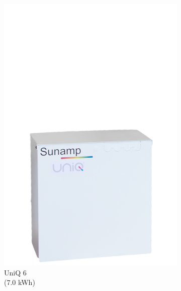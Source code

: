 \begin{figure}[htbp]
\begin{subfigure}{.24\textwidth}
		\includegraphics[width=\textwidth]{figures/sunamp-uniq-6.png}
		\caption{UniQ 6\\
			(7.0 kWh)}
		\label{fig:uniq6}
	\end{subfigure}
	\begin{subfigure}{.24\textwidth}
		\centering

\end{subfigure}
\end{figure}
